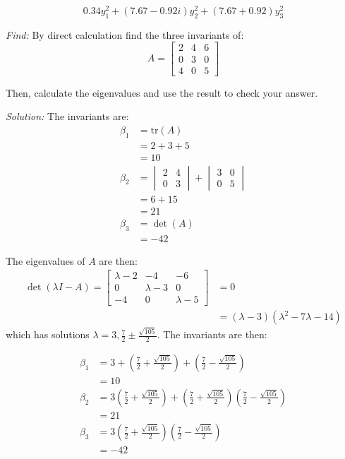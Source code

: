 \documentclass[11pt]{homework}
\begin{document}
\begin{equation*}
0.34 y_1^2 + (7.67 - 0.92i) y_2^2 + (7.67 + 0.92) y_3^2
\end{equation*}

\question
\emph{Find:}
\newline
By direct calculation find the three invariants of:
\begin{equation*}
A = 
  \begin{bmatrix}
  2 & 4 & 6 \\
  0 & 3 & 0 \\
  4 & 0 & 5
  \end{bmatrix}
\end{equation*}

Then, calculate the eigenvalues and use the result to check your answer.

\emph{Solution:}
\newline
The invariants are:
\begin{align*}
\beta_1 &= \text{tr}(A) \\
        &= 2 + 3 + 5 \\
        &= 10 \\
\beta_2 &=
  \begin{vmatrix}
  2 & 4 \\
  0 & 3
  \end{vmatrix}
  +
  \begin{vmatrix}
  3 & 0 \\
  0 & 5
  \end{vmatrix} \\
  &= 6 + 15 \\
  &= 21 \\
\beta_3 &= \det(A) \\
        &= -42
\end{align*}

The eigenvalues of $A$ are then:
\begin{align*}
\det(\lambda I - A) = 
  \begin{bmatrix}
  \lambda - 2 & -4 & -6 \\
  0 & \lambda-3 & 0 \\
  -4 & 0 & \lambda-5
  \end{bmatrix}
  &= 0 \\
  &= (\lambda -3) ( \lambda^2 - 7 \lambda - 14)
\end{align*}
\noindent
which has solutions $\lambda = 3, \frac{7}{2} \pm \frac{\sqrt{105}}{2}$.
The invariants are then:

\begin{align*}
\beta_1 &= 3 
        + \left( \frac{7}{2} + \frac{\sqrt{105}}{2} \right)
        + \left( \frac{7}{2} - \frac{\sqrt{105}}{2} \right) \\
        &= 10 \\
\beta_2 &= 3 \left( \frac{7}{2} + \frac{\sqrt{105}}{2} \right)
        + \left( \frac{7}{2} + \frac{\sqrt{105}}{2} \right) \left( \frac{7}{2} - \frac{\sqrt{105}}{2} \right) \\
        &= 21 \\
\beta_3 &= 3 
         \left( \frac{7}{2} + \frac{\sqrt{105}}{2} \right)
         \left( \frac{7}{2} - \frac{\sqrt{105}}{2} \right) \\
        &= -42
\end{align*}
\end{document}
